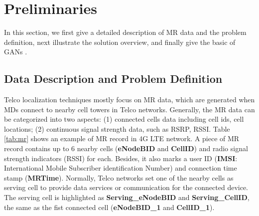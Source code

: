\section{Preliminaries}
In this section, we first give a detailed description of MR data and the problem definition, next illustrate the solution overview, and finally give the basic of GANs \cite{DBLP:conf/nips/GoodfellowPMXWOCB14}.

\subsection{Data Description and Problem Definition}
Telco localization techniques mostly focus on MR data, which are generated when MDs connect to nearby cell towers in Telco networks. Generally, the MR data can be categorized into two aspects: (1) connected cells data including cell ids, cell locations; (2) continuous signal strength data, such as RSRP, RSSI. Table \ref{tab:mr} shows an example of MR record in 4G LTE network. A piece of MR record contains up to 6 nearby cells (\textbf{eNodeBID} and \textbf{CellID}) and radio signal strength indicators (RSSI) for each. Besides, it also marks a user ID (\textbf{IMSI}: International Mobile Subscriber identification Number) and connection time stamp (\textbf{MRTime}). Normally, Telco networks set one of the nearby cells as serving cell to provide data services or communication for the connected device. The serving cell is highlighted as \textbf{Serving\_eNodeBID} and \textbf{Serving\_CellID}, the same as the fist connected cell (\textbf{eNodeBID\_1} and \textbf{CellID\_1}).


